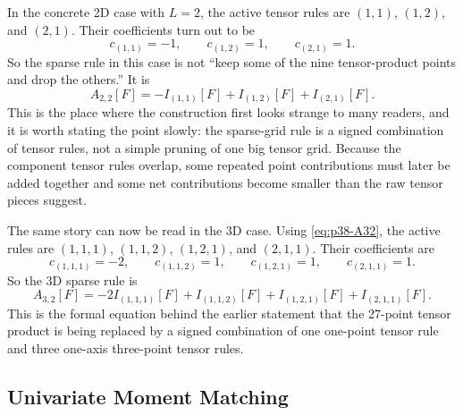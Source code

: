 \documentclass[11pt]{article}
\numberwithin{equation}{section}
\begin{document}
In the concrete 2D case with \(L=2\), the active tensor rules are
\((1,1)\), \((1,2)\), and \((2,1)\).  Their coefficients turn out to be
\begin{equation}
  c_{(1,1)}=-1,
  \qquad
  c_{(1,2)}=1,
  \qquad
  c_{(2,1)}=1.
  \label{eq:p36-2d-smolyak-coeffs}
\end{equation}
So the sparse rule in this case is not ``keep some of the nine tensor-product
points and drop the others.''  It is
\begin{equation}
  A_{2,2}[F] = -I_{(1,1)}[F] + I_{(1,2)}[F] + I_{(2,1)}[F].
  \label{eq:p36-2d-smolyak-rule}
\end{equation}
This is the place where the construction first looks strange to many readers,
and it is worth stating the point slowly: the sparse-grid rule is a signed
combination of tensor rules, not a simple pruning of one big tensor grid.
Because the component tensor rules overlap, some repeated point contributions
must later be added together and some net contributions become smaller than the
raw tensor pieces suggest.

The same story can now be read in the 3D case.  Using
\eqref{eq:p38-A32}, the active rules are
\((1,1,1)\), \((1,1,2)\), \((1,2,1)\), and \((2,1,1)\).  Their coefficients are
\begin{equation}
  c_{(1,1,1)}=-2,
  \qquad
  c_{(1,1,2)}=1,
  \qquad
  c_{(1,2,1)}=1,
  \qquad
  c_{(2,1,1)}=1.
  \label{eq:p38-3d-smolyak-coeffs-repeat}
\end{equation}
So the 3D sparse rule is
\begin{equation}
  A_{3,2}[F]
  =
  -2I_{(1,1,1)}[F]+I_{(1,1,2)}[F]+I_{(1,2,1)}[F]+I_{(2,1,1)}[F].
  \label{eq:p38-3d-smolyak-rule}
\end{equation}
This is the formal equation behind the earlier statement that the 27-point tensor
product is being replaced by a signed combination of one one-point tensor rule
and three one-axis three-point tensor rules.

\subsection{Univariate Moment Matching}
\label{subsec:p32-univariate-moment-matching}
\end{document}

